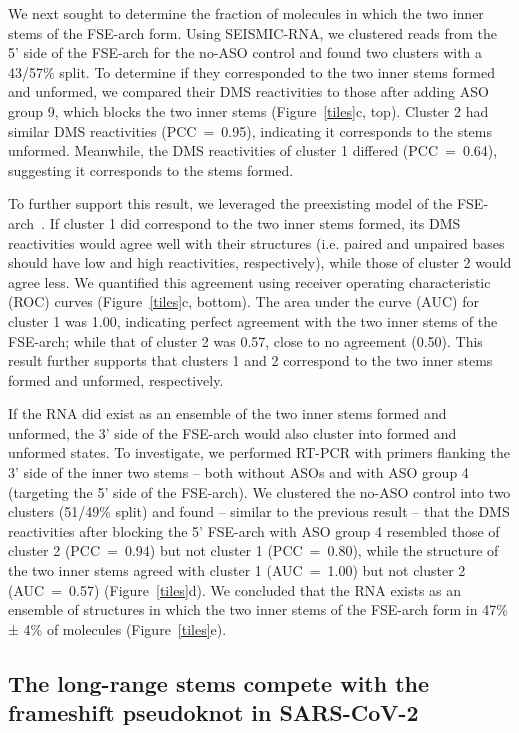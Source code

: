 \documentclass[main.tex]{subfiles}
\begin{document}
We next sought to determine the fraction of molecules in which the two inner stems of the FSE-arch form.
Using SEISMIC-RNA, we clustered reads from the 5' side of the FSE-arch for the no-ASO control and found two clusters with a 43/57\% split.
To determine if they corresponded to the two inner stems formed and unformed, we compared their DMS reactivities to those after adding ASO group 9, which blocks the two inner stems (Figure~\ref{tiles}c, top).
Cluster 2 had similar DMS reactivities (PCC~=~0.95), indicating it corresponds to the stems unformed.
Meanwhile, the DMS reactivities of cluster 1 differed (PCC~=~0.64), suggesting it corresponds to the stems formed.

To further support this result, we leveraged the preexisting model of the FSE-arch~\cite{Ziv2020}.
If cluster 1 did correspond to the two inner stems formed, its DMS reactivities would agree well with their structures (i.e. paired and unpaired bases should have low and high reactivities, respectively), while those of cluster 2 would agree less.
We quantified this agreement using receiver operating characteristic (ROC) curves (Figure~\ref{tiles}c, bottom).
The area under the curve (AUC) for cluster 1 was 1.00, indicating perfect agreement with the two inner stems of the FSE-arch; while that of cluster 2 was 0.57, close to no agreement (0.50).
This result further supports that clusters 1 and 2 correspond to the two inner stems formed and unformed, respectively.

If the RNA did exist as an ensemble of the two inner stems formed and unformed, the 3' side of the FSE-arch would also cluster into formed and unformed states.
To investigate, we performed RT-PCR with primers flanking the 3' side of the inner two stems -- both without ASOs and with ASO group 4 (targeting the 5' side of the FSE-arch).
We clustered the no-ASO control into two clusters (51/49\% split) and found -- similar to the previous result -- that the DMS reactivities after blocking the 5' FSE-arch with ASO group 4 resembled those of cluster 2 (PCC~=~0.94) but not cluster 1 (PCC~=~0.80), while the structure of the two inner stems agreed with cluster 1 (AUC~=~1.00) but not cluster 2 (AUC~=~0.57) (Figure~\ref{tiles}d).
We concluded that the RNA exists as an ensemble of structures in which the two inner stems of the FSE-arch form in 47\% ± 4\% of molecules (Figure~\ref{tiles}e).

\subsection{The long-range stems compete with the frameshift pseudoknot in SARS-CoV-2}
\end{document}
